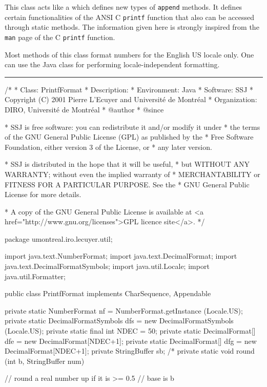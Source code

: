 
This class acts like a  which defines new types
of \texttt{append} methods.
It defines certain functionalities of the ANSI C \texttt{printf}
function that also can be accessed through static methods.
The information given here is strongly inspired
from the \texttt{man} page of the C \texttt{printf} function.

Most methods of this class format numbers for the English US
locale only. One can use the Java class 
for performing locale-independent formatting.

\bigskip\hrule

\begin{code}
\begin{hide}
/*
 * Class:        PrintfFormat
 * Description:  
 * Environment:  Java
 * Software:     SSJ 
 * Copyright (C) 2001  Pierre L'Ecuyer and Université de Montréal
 * Organization: DIRO, Université de Montréal
 * @author       
 * @since

 * SSJ is free software: you can redistribute it and/or modify it under
 * the terms of the GNU General Public License (GPL) as published by the
 * Free Software Foundation, either version 3 of the License, or
 * any later version.

 * SSJ is distributed in the hope that it will be useful,
 * but WITHOUT ANY WARRANTY; without even the implied warranty of
 * MERCHANTABILITY or FITNESS FOR A PARTICULAR PURPOSE.  See the
 * GNU General Public License for more details.

 * A copy of the GNU General Public License is available at
   <a href="http://www.gnu.org/licenses">GPL licence site</a>.
 */
\end{hide}
package umontreal.iro.lecuyer.util; \begin{hide}

import java.text.NumberFormat;
import java.text.DecimalFormat;
import java.text.DecimalFormatSymbols;
import java.util.Locale;
import java.util.Formatter;
\end{hide}


public class PrintfFormat implements CharSequence, Appendable\begin{hide} {
   private static NumberFormat nf = NumberFormat.getInstance (Locale.US);
   private static DecimalFormatSymbols dfs =
       new DecimalFormatSymbols (Locale.US);
   private static final int NDEC = 50;
   private static DecimalFormat[] dfe = new DecimalFormat[NDEC+1];
   private static DecimalFormat[] dfg = new DecimalFormat[NDEC+1];
   private StringBuffer sb;
/*
   private static void round (int b, StringBuffer num) {
      // round a real number up if it is >= 0.5
      // base is b

}}
\end{hide}
\end{code}
